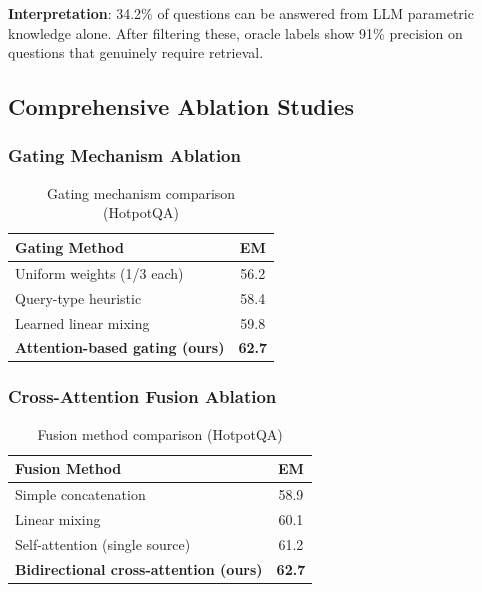 \documentclass[10pt,twocolumn]{article}
\begin{document}
\textbf{Interpretation}: 34.2\% of questions can be answered from LLM parametric knowledge alone. After filtering these, oracle labels show 91\% precision on questions that genuinely require retrieval.


\subsection{Comprehensive Ablation Studies}
\label{sec:ablations}

\subsubsection{Gating Mechanism Ablation}
\label{sec:gating_ablation}

\begin{table}[h]
\centering
\caption{Gating mechanism comparison (HotpotQA)}
\label{tab:gating_ablation}
\small
\begin{tabular}{@{}lc@{}}
\toprule
\textbf{Gating Method} & \textbf{EM} \\
\midrule
Uniform weights (1/3 each) & 56.2 \\
Query-type heuristic & 58.4 \\
Learned linear mixing & 59.8 \\
\textbf{Attention-based gating (ours)} & \textbf{62.7} \\
\bottomrule
\end{tabular}
\end{table}

\subsubsection{Cross-Attention Fusion Ablation}
\label{sec:fusion_ablation}

\begin{table}[h]
\centering
\caption{Fusion method comparison (HotpotQA)}
\label{tab:fusion_ablation}
\small
\begin{tabular}{@{}lc@{}}
\toprule
\textbf{Fusion Method} & \textbf{EM} \\
\midrule
Simple concatenation & 58.9 \\
Linear mixing & 60.1 \\
Self-attention (single source) & 61.2 \\
\textbf{Bidirectional cross-attention (ours)} & \textbf{62.7} \\
\bottomrule
\end{tabular}
\end{table}
\end{document}
